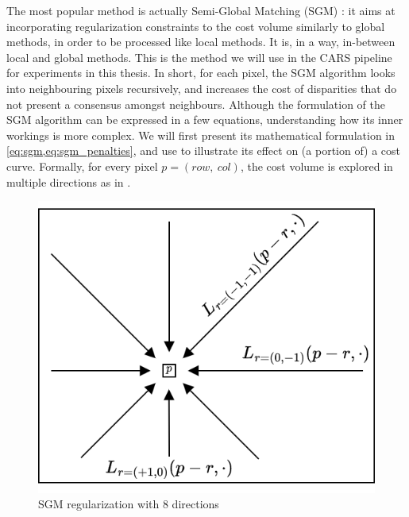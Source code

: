 The most popular method is actually Semi-Global Matching (SGM) \cite{hirschmuller_accurate_2005}: it aims at incorporating regularization constraints to the cost volume similarly to global methods, in order to be processed like local methods. It is, in a way, in-between local and global methods. This is the method we will use in the CARS pipeline for experiments in this thesis. In short, for each pixel, the SGM algorithm looks into neighbouring pixels recursively, and increases the cost of disparities that do not present a consensus amongst neighbours. Although the formulation of the SGM algorithm can be expressed in a few equations, understanding how its inner workings is more complex. We will first present its mathematical formulation in \cref{eq:sgm,eq:sgm_penalties}, and use  to illustrate its effect on (a portion of) a cost curve. Formally, for every pixel $p=(row, ~col)$, the cost volume is explored in multiple directions as in .

\begin{figure}
	\centering
	\includegraphics[width=0.5\linewidth]{Images/Chap_1/SGM_directions.png}
	\caption{SGM regularization with $8$ directions}
	\label{fig:sgm_directions}
\end{figure}


